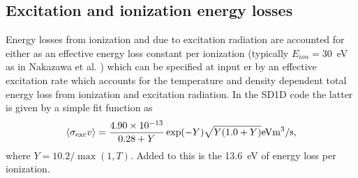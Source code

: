 \documentclass[amsmath,amssymb,a4]{revtex4}
\begin{document}
\subsection{Excitation and ionization energy losses}

Energy losses from ionization and due to excitation radiation are accounted for either as an effective energy loss constant per ionization (typically $E_{ion} = 30$~eV as in Nakazawa et al. \cite{nakazawa2000}) which can be specified at input er by an effective excitation rate which accounts for the temperature and density dependent total energy loss from ionization and excitation radiation. In the SD1D code the latter is given by a simple fit function as
\begin{equation}\label{excitation_SD1D}
    \langle\sigma_{\rm exc} v\rangle = {4.90 \times 10^{-13} \over 0.28 + Y} \exp(-Y) \sqrt{Y (1.0 + Y)} {\rm eV} {\rm m}^3/{\rm s},
\end{equation}
where $Y = 10.2 / \max( 1, T)$. Added to this is the 13.6~eV of energy loss per ionization.
\end{document}

